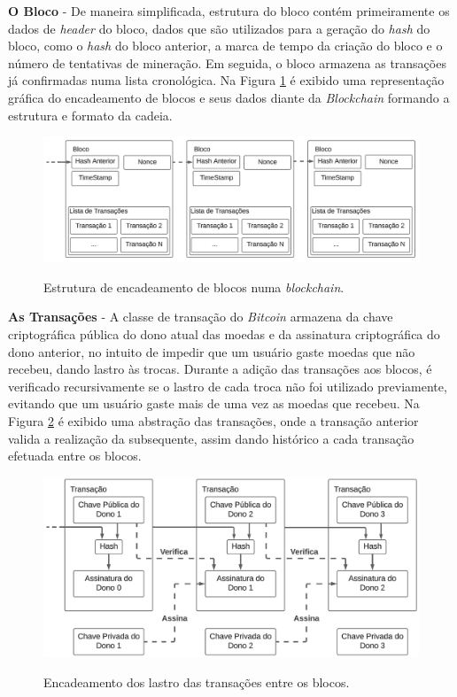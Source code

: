 \documentclass[article,12pt,oneside,a4paper,english,brazil]{unifil}
\begin{document}
\begin{Spacing}{1.5}
\textbf{O Bloco} - De maneira simplificada, estrutura do bloco contém primeiramente os dados de \textit{header} do bloco, dados que são utilizados para a geração do \textit{hash} do bloco, como o \textit{hash} do bloco anterior, a marca de tempo da criação do bloco e o número de tentativas de mineração. Em seguida, o bloco armazena as transações já confirmadas numa lista cronológica. Na Figura \ref*{fig:blockchain} é exibido uma representação gráfica do encadeamento de blocos e seus dados diante da \textit{Blockchain} formando a estrutura e formato da cadeia.

\begin{figure}[H]
	\centering
	\captionsetup{justification=centering}
	\caption{Estrutura de encadeamento de blocos numa \textit{blockchain}.}
	\includegraphics[width=.8\linewidth]{../images/figura 2.png}
	\label{fig:blockchain}
\end{figure}


\textbf{As Transações} - A classe de transação do \textit{Bitcoin} armazena da chave criptográfica pública do dono atual das moedas e da assinatura criptográfica do dono anterior, no intuito de impedir que um usuário gaste moedas que não recebeu, dando lastro às trocas. Durante a adição das transações aos blocos, é verificado recursivamente se o lastro de cada troca não foi utilizado previamente, evitando que um usuário gaste mais de uma vez as moedas que recebeu. Na Figura \ref*{fig:transactions} é exibido uma abstração das transações, onde a transação anterior valida a realização da subsequente, assim dando histórico a cada transação efetuada entre os blocos.

\begin{figure}[H]
	\centering
	\captionsetup{justification=centering}
	\caption{Encadeamento dos lastro das transações entre os blocos.}
	\includegraphics[width=.8\linewidth]{../images/figura 1.png}
	\label{fig:transactions}


\end{figure}
\end{Spacing}
\end{document}
